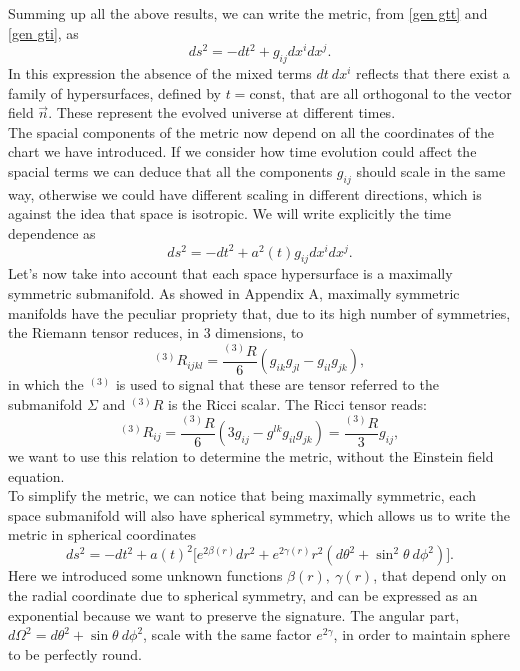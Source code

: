 Summing up all the above results, we can write the metric, from \eqref{gen gtt} and \eqref{gen gti}, as
\begin{equation*}
    ds^2=-dt^2+g_{ij}dx^i dx^j.
\end{equation*}
In this expression the absence of the mixed terms $dt\ dx^i$ reflects that there exist a family of hypersurfaces, defined by $t=$const, that are all orthogonal to the vector field $\vec n$. These represent the evolved universe at different times.\\
The spacial components of the metric now depend on all the coordinates of the chart we have introduced. If we consider how time evolution could affect the spacial terms we can deduce that all the components $g_{ij}$ should scale in the same way, otherwise we could have different scaling in different directions, which is against the idea that space is isotropic. We will write explicitly the time dependence as
\begin{equation*}
    ds^2=-dt^2+a^2(t)g_{ij}dx^i dx^j.
\end{equation*} 
Let's now take into account that each space hypersurface is a maximally symmetric submanifold. 
As showed in Appendix A, maximally symmetric manifolds have the peculiar propriety that, due to its high number of symmetries, the Riemann tensor reduces, in 3 dimensions, to 
\begin{equation}
    ^{(3)}R_{ijkl}=\frac{^{(3)}R}{6}(g_{ik}g_{jl}-g_{il}g_{jk}),
\end{equation}
in which the $^{(3)}$ is used to signal that these are tensor referred to the submanifold $\Sigma$ and $^{(3)}R$ is the Ricci scalar. The Ricci tensor reads:
\begin{equation}\label{maxsymRicci}
    ^{(3)}R_{ij}=\frac{^{(3)}R}{6}(3g_{ij}-g^{lk}g_{il}g_{jk})=\frac{^{(3)}R}{3}g_{ij},
\end{equation}
we want to use this relation to determine the metric, without the Einstein field equation.\\
To simplify the metric, we can notice that being maximally symmetric, each space submanifold will also have spherical symmetry, which allows us to write the metric in spherical coordinates
\begin{equation}
    ds^2=-dt^2+a(t)^2\big[e^{2\beta(r)}dr^2+e^{2\gamma(r)}r^2(d\theta^2+\sin^2\theta\ d\phi^2)\big].
\end{equation}  
Here we introduced some unknown functions $\beta(r),\ \gamma(r)$, that depend only on the radial coordinate due to spherical symmetry, and can be expressed as an exponential because we want to preserve the signature. The angular part, $d\Omega^2= d\theta^2+\sin\theta\ d\phi^2$, scale with the same factor $e^{2\gamma}$, in order to maintain sphere to be perfectly round.\\
